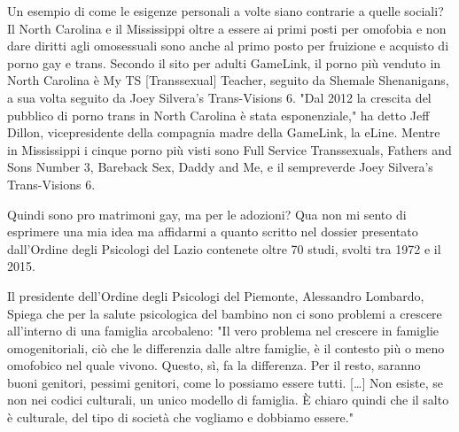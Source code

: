 \documentclass[12pt]{book} %
\begin{document}
\begin{mdframed}[linewidth=1pt]
Un esempio di come le esigenze personali a volte siano contrarie a quelle sociali? Il North Carolina e il Mississippi
oltre a essere ai primi posti per omofobia e non dare diritti agli omosessuali sono anche al primo posto per fruizione
e acquisto di porno gay e trans. Secondo il sito per adulti GameLink, il porno più venduto in North Carolina è My TS
[Transsexual] Teacher, seguito da Shemale Shenanigans, a sua volta seguito da Joey Silvera's Trans-Visions 6.
"Dal 2012 la crescita del pubblico di porno trans in North Carolina è stata esponenziale,"
ha detto Jeff Dillon, vicepresidente della compagnia madre della GameLink, la eLine. Mentre in Mississippi i cinque
porno più visti sono Full Service Transsexuals, Fathers and Sons Number 3, Bareback Sex, Daddy and Me, e il sempreverde
Joey Silvera's Trans-Visions
6.

Quindi sono pro matrimoni gay, ma per le adozioni? Qua non mi sento di esprimere una mia idea ma affidarmi a quanto
scritto nel
dossier presentato dall'Ordine degli Psicologi del Lazio contenete oltre 70 studi, svolti tra 1972 e il 2015. 

Il presidente dell'Ordine degli Psicologi del Piemonte, Alessandro Lombardo, Spiega che per la salute psicologica del
bambino non ci sono problemi a crescere all'interno di una famiglia arcobaleno: "Il
vero problema nel crescere in famiglie omogenitoriali, ciò che le differenzia dalle altre famiglie, è il contesto più o
meno omofobico nel quale vivono. Questo, sì, fa la differenza. Per il resto, saranno buoni genitori, pessimi genitori,
come lo possiamo essere tutti. […] Non esiste, se non nei codici culturali, un unico modello di famiglia. È chiaro
quindi che il salto è culturale, del tipo di società che vogliamo e dobbiamo
essere."
\end{mdframed}
\end{document}
